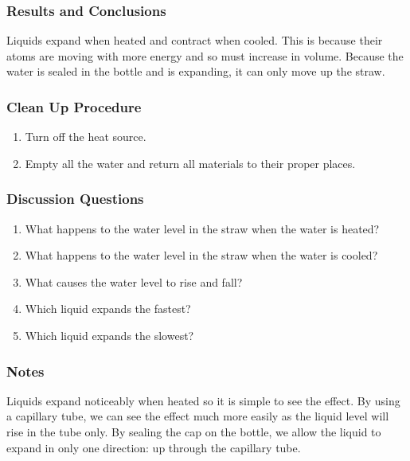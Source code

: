 \subsubsection*{Results and Conclusions}
Liquids expand when heated and contract when cooled. This is because their atoms are moving with more energy and so must increase in volume. Because the water is sealed in the bottle and is expanding, it can only move up the straw.  

\subsubsection*{Clean Up Procedure}
\begin{enumerate}
\item{Turn off the heat source.} 
\item{Empty all the water and return all materials to their proper places.} 
\end{enumerate}

\subsubsection*{Discussion Questions}
\begin{enumerate}
\item{What happens to the water level in the straw when the water is heated?}
\item{What happens to the water level in the straw when the water is cooled?}
\item{What causes the water level to rise and fall?}
\item{Which liquid expands the fastest?}
\item{Which liquid expands the slowest?}
\end{enumerate}

\subsubsection*{Notes}
Liquids expand noticeably when heated so it is simple to see the effect. By using a capillary tube, we can see the effect much more easily as the liquid level will rise in the tube only. By sealing the cap on the bottle, we allow the liquid to expand in only one direction: up through the capillary tube.  


